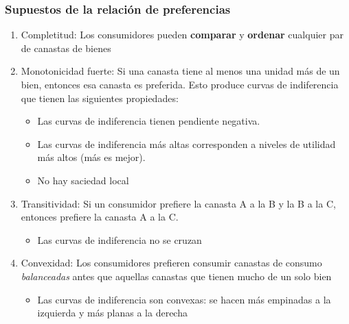 \documentclass{beamer}
\begin{document}
\begin{frame}
\frametitle{Supuestos de la relación de preferencias}
\begin{enumerate}
\item Completitud: Los consumidores pueden \textbf{comparar} y \textbf{ordenar} cualquier par de canastas de bienes
\item Monotonicidad fuerte: Si una canasta tiene al menos una unidad más de un bien, entonces esa canasta es preferida. Esto produce curvas de indiferencia que tienen las siguientes propiedades:
    \begin{itemize}
        \item Las curvas de indiferencia tienen pendiente negativa. 
        \item Las curvas de indiferencia más altas corresponden a niveles de utilidad más altos (más es mejor).
        \item No hay saciedad local
    \end{itemize}
\item Transitividad: Si un consumidor prefiere la canasta A a la B y la B a la C, entonces prefiere la canasta A a la C.
    \begin{itemize}
        \item Las curvas de indiferencia no se cruzan
    \end{itemize}
\item Convexidad: Los consumidores prefieren consumir canastas de consumo \textit{balanceadas} antes que aquellas canastas que tienen mucho de un solo bien
    \begin{itemize}
        \item Las curvas de indiferencia son convexas: se hacen más empinadas a la izquierda y más planas a la derecha 
    \end{itemize}
\end{enumerate} 
\end{frame}
\end{document}
